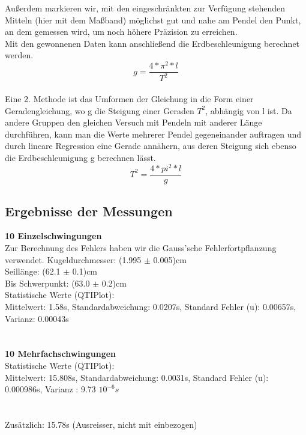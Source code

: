 \documentclass[12pt,a4paper]{article}
\begin{document}
\begin{multicols}{2}
Außerdem markieren wir, mit den eingeschränkten zur Verfügung stehenden Mitteln (hier mit dem Maßband) möglichst gut und nahe am Pendel den Punkt, an dem gemessen wird, um noch höhere Präzision zu erreichen.
\\
Mit den gewonnenen Daten kann anschließend die Erdbeschleunigung berechnet werden.\\
\begin{equation}
	g = \frac{4*\pi^2*l}{T^2}
\end{equation}
\\
Eine 2. Methode ist das Umformen der Gleichung in die Form einer Geradengleichung, wo g die Steigung einer Geraden
$T^2$, abhängig von l ist. Da andere Gruppen den gleichen Versuch mit Pendeln mit anderer Länge durchführen, kann man die Werte mehrerer Pendel gegeneinander auftragen und durch lineare Regression eine Gerade annähern, aus deren Steigung sich ebenso die Erdbeschleunigung g berechnen lässt.\\
\begin{equation}
	T^2= \frac{4*pi^2*l}{g}
\end{equation}

\subsection{Ergebnisse der Messungen}
\textbf{10 Einzelschwingungen}\\
Zur Berechnung des Fehlers haben wir die Gauss'sche Fehlerfortpflanzung verwendet.
Kugeldurchmesser: (1.995 $\pm$ 0.005)cm\\
Seillänge: (62.1 $\pm$  0.1)cm\\
Bis Schwerpunkt: (63.0 $\pm$ 0.2)cm\\
Statistische Werte (QTIPlot):\\
Mittelwert: 1.58s, Standardabweichung: 0.0207s, Standard Fehler (u): 0.00657s, Varianz: 0.00043s\\
\\
\\
\textbf{10 Mehrfachschwingungen}\\
Statistische Werte (QTIPlot):\\
Mittelwert: 15.808s, Standardabweichung: 0.0031s, Standard Fehler (u): 0.000986s, Varianz : 9.73 $10^{-6}s$\\
\\
\\
Zusätzlich: 15.78s (Ausreisser, nicht mit einbezogen)\\

\end{multicols}
\end{document}
